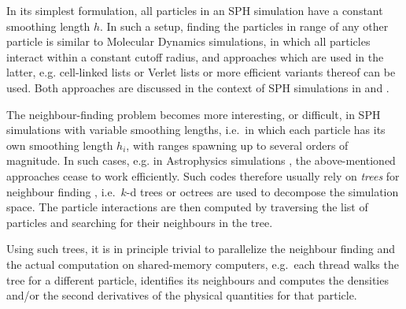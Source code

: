 \documentclass[final]{siamltex}
\begin{document}
In its simplest formulation, all particles in an SPH simulation have
a constant smoothing length $h$.
In such a setup, finding the particles in range of any other particle
is similar to Molecular Dynamics simulations, in which all particles
interact within a constant cutoff radius, and approaches which are used
in the latter, e.g. cell-linked lists
\cite{ref:Allen1989} or Verlet lists \cite{ref:Verlet1967}
or more efficient variants thereof \cite{ref:Gonnet2012,ref:Gonnet2013}
can be used.
Both approaches are discussed in the context of SPH simulations
in \cite{ref:Dominguez2011} and \cite{ref:Viccione2008}.

The neighbour-finding problem becomes more interesting, or difficult,
in SPH simulations with variable smoothing lengths, i.e.~in which
each particle has its own smoothing length $h_i$, with ranges spawning
up to several orders of magnitude.
In such cases, e.g. in Astrophysics simulations \cite{ref:Gingold1977},
the above-mentioned approaches cease to work efficiently.
Such codes therefore usually rely on {\em trees}
for neighbour finding \cite{ref:Hernquist1989,ref:Springel2005,ref:Wadsley2004},
i.e.~$k$-d trees \cite{ref:Bentley1975} or octrees \cite{ref:Meagher1982}
are used to decompose the simulation space. 
The particle interactions are then computed by traversing the list of
particles and searching for their neighbours in the tree.

Using such trees, it is in principle trivial to parallelize
the neighbour finding and the actual computation on shared-memory
computers,
e.g.~each thread walks the tree for a different particle,
identifies its neighbours and computes the densities and/or
the second derivatives of the physical quantities for that particle.
\end{document}
